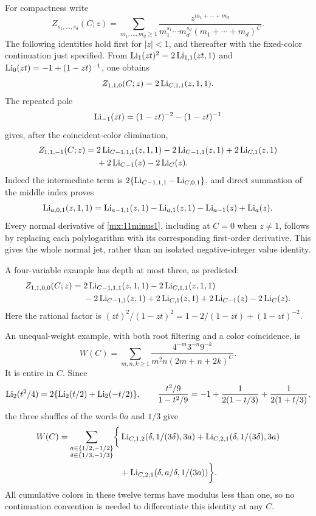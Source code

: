 For compactness write
\[
 Z_{s_1,\ldots,s_d}(C;z)
  =\sum_{m_1,\ldots,m_d\geq1}
      \frac{z^{m_1+\cdots+m_d}}
       {m_1^{s_1}\cdots m_d^{s_d}(m_1+\cdots+m_d)^C}.
\]
The following identities hold first for $|z|<1$, and thereafter with
the fixed-color continuation just specified.  From
$\operatorname{Li}_1(zt)^2=2\operatorname{Li}_{1,1}(zt,1)$ and
$\operatorname{Li}_0(zt)=-1+(1-zt)^{-1}$, one obtains
\begin{equation}\label{mx:110}
 Z_{1,1,0}(C;z)=2\operatorname{Li}_{C,1,1}(z,1,1).
\end{equation}
The repeated pole
\[
 \operatorname{Li}_{-1}(zt)=(1-zt)^{-2}-(1-zt)^{-1}
\]
gives, after the coincident-color elimination,
\begin{align}\label{mx:11minus1}
 Z_{1,1,-1}(C;z)={}&2\operatorname{Li}_{C-1,1,1}(z,1,1)
                   -2\operatorname{Li}_{C-1,1}(z,1)
                   +2\operatorname{Li}_{C,1}(z,1)\notag\\
                 &+2\operatorname{Li}_{C-1}(z)-2\operatorname{Li}_C(z).
\end{align}
Indeed the intermediate term is
$2\{\operatorname{Li}_{C-1,1,1}-\operatorname{Li}_{C,0,1}\}$, and direct summation of
the middle index proves
\[
 \operatorname{Li}_{a,0,1}(z,1,1)
 =\operatorname{Li}_{a-1,1}(z,1)-\operatorname{Li}_{a,1}(z,1)
      -\operatorname{Li}_{a-1}(z)+\operatorname{Li}_a(z).
\]
Every normal derivative of \eqref{mx:11minus1}, including at $C=0$
when $z\ne1$, follows by replacing each polylogarithm with its
corresponding first-order derivative.  This gives the whole normal
jet, rather than an isolated negative-integer value identity.

A four-variable example has depth at most three, as predicted:
\begin{align}\label{mx:1100}
 Z_{1,1,0,0}(C;z)={}&2\operatorname{Li}_{C-1,1,1}(z,1,1)
                    -2\operatorname{Li}_{C,1,1}(z,1,1)\notag\\
                  &-2\operatorname{Li}_{C-1,1}(z,1)
                    +2\operatorname{Li}_{C,1}(z,1)
                    +2\operatorname{Li}_{C-1}(z)-2\operatorname{Li}_C(z).
\end{align}
Here the rational factor is
$(zt)^2/(1-zt)^2=1-2/(1-zt)+(1-zt)^{-2}$.

An unequal-weight example, with both root filtering and a color
coincidence, is
\begin{equation}\label{mx:weightedexample}
 W(C)=\sum_{m,n,k\geq1}
       \frac{4^{-m}3^{-n}9^{-k}}{m^2n(2m+n+2k)^C}.
\end{equation}
It is entire in $C$.  Since
\[
 \operatorname{Li}_2(t^2/4)=2\{\operatorname{Li}_2(t/2)+\operatorname{Li}_2(-t/2)\},\qquad
 \frac{t^2/9}{1-t^2/9}
   =-1+\frac1{2(1-t/3)}+\frac1{2(1+t/3)},
\]
the three shuffles of the words $0a$ and $1/3$ give
\begin{align}\label{mx:weightedanswer}
 W(C)=\sum_{\substack{a\in\{1/2,-1/2\}\\
                     \delta\in\{1/3,-1/3\}}}
 \biggl\{&\operatorname{Li}_{C,1,2}(\delta,1/(3\delta),3a)
       +\operatorname{Li}_{C,2,1}(\delta,1/(3\delta),3a)\notag\\
       &+\operatorname{Li}_{C,2,1}(\delta,a/\delta,1/(3a))\biggr\}.
\end{align}
All cumulative colors in these twelve terms have modulus less than
one, so no continuation convention is needed to differentiate this
identity at any $C$.

